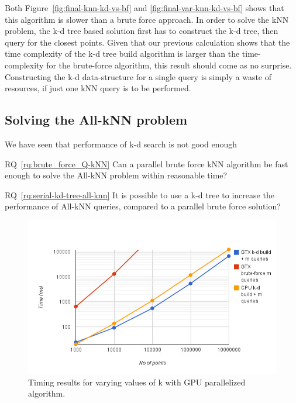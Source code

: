 Both Figure~\ref{fig:final-knn-kd-vs-bf} and \ref{fig:final-var-knn-kd-vs-bf} shows that this algorithm is slower than a brute force approach. In order to solve the kNN problem, the k-d tree based solution first has to construct the k-d tree, then query for the closest points. Given that our previous calculation shows that the time complexity of the k-d tree build algorithm is larger than the time-complexity for the brute-force algorithm, this result should come as no surprise. Constructing the k-d data-structure for a single query is simply a waste of resources, if just one kNN query is to be performed.

\subsection{Solving the All-kNN problem} %
\label{sub:solving_the_all_knn_problem}

We have seen that performance of k-d search is not good enough 

RQ~\ref{rq:brute_force_Q-kNN} Can a parallel brute force kNN algorithm be fast enough to solve the All-kNN problem within reasonable time?

RQ~\ref{rq:serial-kd-tree-all-knn} It is possible to use a k-d tree to increase the performance of All-kNN queries, compared to a parallel brute force solution?

\begin{figure}[ht!]
    \centering
    \includegraphics[width=120mm]{../gfx/final-all-knn-gpu-vs-cpu-vs-bf.png}
    \caption{Timing results for varying values of k with GPU parallelized algorithm.}
    \label{fig:final-all-knn-gpu-vs-cpu-vs-bf}
\end{figure}

